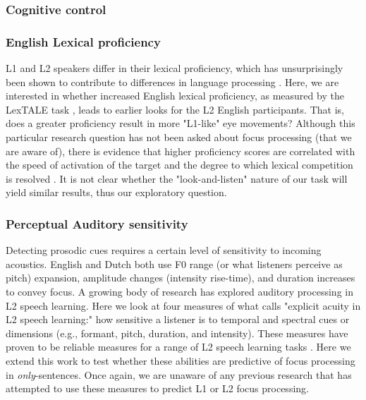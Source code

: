 \subsubsection{Cognitive control}

\subsubsection{English Lexical proficiency}
L1 and L2 speakers differ in their lexical proficiency, which has unsurprisingly been shown to contribute to differences in language processing \citep{Yap2012, zareva2005relationship}. Here, we are interested in whether increased English lexical proficiency, as measured by the LexTALE task \citep{lemhofer2012introducing}, leads to earlier looks for the L2 English participants. That is, does a greater proficiency result in more "L1-like" eye movements? Although this particular research question has not been asked about focus processing (that we are aware of), there is evidence that higher proficiency scores are correlated with the speed of activation of the target and the degree to which lexical competition is resolved \citep{sarrett2022within}. It is not clear whether the "look-and-listen" nature of our task will yield similar results, thus our exploratory question.

 

\subsubsection{Perceptual Auditory sensitivity}
Detecting prosodic cues requires a certain level of sensitivity to incoming acoustics. English and Dutch both use F0 range (or what listeners perceive as pitch) expansion, amplitude changes (intensity rise-time), and duration increases to convey focus. A growing body of research has explored auditory processing in L2 speech learning. Here we look at four measures of what \cite{saito2023does} calls "explicit acuity in L2 speech learning:" how sensitive a listener is to temporal and spectral cues or dimensions (e.g., formant,
pitch, duration, and intensity). These measures have proven to be reliable measures for a range of L2 speech learning tasks \citep{Kachlicka_Saito_Tierney_2019, bakkouche2025effects, bramlett_wiener_24_speechprosody}. Here we extend this work to test whether these abilities are predictive of focus processing in \textit{only}-sentences. Once again, we are unaware of any previous research that has attempted to use these measures to predict L1 or L2 focus processing.



